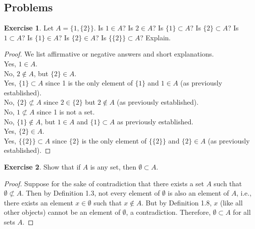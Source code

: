 \documentclass[titlepage]{article}
\newcounter{script}
\theoremstyle{definition}
\newtheorem{exercise}{Exercise}[script]
\begin{document}
\subsection{Problems}
\setcounter{exercise}{3}
\begin{exercise}
    Let $A=\{1,\{2\}\}$. Is $1\in A$? Is $2\in A$? Is $\{1\}\subset A$? Is $\{2\}\subset A$? Is $1\subset A$? Is $\{1\}\in A$? Is $\{2\}\in A$? Is $\{\{2\}\}\subset A$? Explain.
    \begin{proof}
        We list affirmative or negative answers and short explanations.\\[3pt]
        Yes, $1\in A$.\\
        No, $2\notin A$, but $\{2\}\in A$.\\
        Yes, $\{1\}\subset A$ since 1 is the only element of $\{1\}$ and $1\in A$ (as previously established).\\
        No, $\{2\}\not\subset A$ since $2\in\{2\}$ but $2\notin A$ (as previously established).\\
        No, $1\not\subset A$ since 1 is not a set.\\
        No, $\{1\}\notin A$, but $1\in A$ and $\{1\}\subset A$ as previously established.\\
        Yes, $\{2\}\in A$.\\
        Yes, $\{\{2\}\}\subset A$ since $\{2\}$ is the only element of $\{\{2\}\}$ and $\{2\}\in A$ (as previously established).
    \end{proof}
\end{exercise}

\setcounter{exercise}{9}

\begin{exercise}
    Show that if $A$ is any set, then $\emptyset\subset A$.
    \begin{proof}
        Suppose for the sake of contradiction that there exists a set $A$ such that $\emptyset\not\subset A$. Then by Definition 1.3, not every element of $\emptyset$ is also an element of $A$, i.e., there exists an element $x\in\emptyset$ such that $x\notin A$. But by Definition 1.8, $x$ (like all other objects) cannot be an element of $\emptyset$, a contradiction. Therefore, $\emptyset\subset A$ for all sets $A$.
    \end{proof}
\end{exercise}

\setcounter{exercise}{20}
\end{document}
